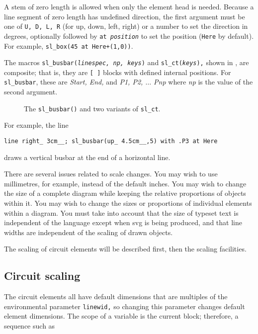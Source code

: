 A stem of zero length is allowed when only the element head is needed.
Because a line segment of zero length has undefined direction, the
first argument must be one of {\tt U, D, L, R} (for up, down, left, right)
or a number to set the direction in degrees, optionally followed by
{\tt at {\sl position}} to set the position ({\tt Here} by default).
For example, {\tt sl\_box(45 at Here+(1,0))}.

The macros {\tt sl\_busbar({\sl linespec, np, keys})} and 
{\tt sl\_ct({\sl keys}),}
shown in ,
are composite; that is, they are {\tt [ ]} blocks with defined
internal positions. For {\tt sl\_busbar}, these are
{\sl Start, End,} and
{\sl P1, P2, $\ldots$ Pnp} where {\sl np} is the value of the
second argument.
\begin{figure}[h!t]
   \SLDComposite
   \caption{The {\tt sl\_busbar()} and two variants of {\tt sl\_ct}.}
   \label{SLDComposite}
   \end{figure}

For example, the line
\par
{\tt line right\_ 3cm\_\_; sl\_busbar(up\_ 4.5cm\_\_,5) with .P3 at Here}
\vspace*{\parsep}
\par
\noindent%
 draws a vertical busbar at the end of a horizontal line.


There are several issues related to scale changes.  You may wish to use
millimetres, for example, instead of the default inches.  You may wish
to change the size of a complete diagram while keeping the relative
proportions of objects within it.  You may wish to change the sizes
or proportions of individual elements within a diagram.  You must take
into account that the size of typeset text is independent of the \pic
language except when svg is being produced, and that line widths are
independent of the scaling of drawn objects.

The scaling of circuit elements will be described first, then
the \pic scaling facilities.

\subsection{Circuit scaling\label{Circuitscaling:}}
The circuit elements all have default dimensions
that are multiples of the \pic environmental parameter {\tt linewid,}
so changing this parameter changes default element dimensions.
The scope of a \pic variable is the current block; therefore, a sequence
such as

